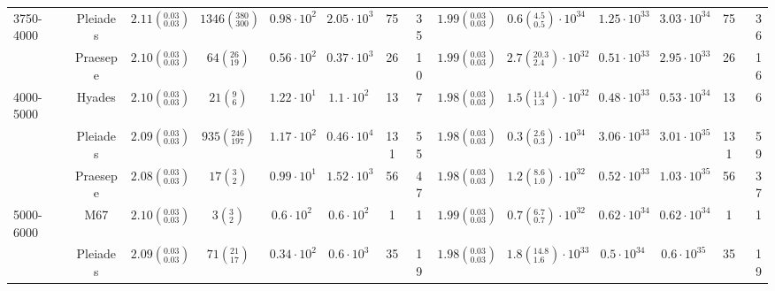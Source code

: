 \begin{tabular}{lccccccccccccr}
3750-4000 & Pleiades &  $2.11\left(^{0.03}_{0.03}\right)$ &    $1346\left(^{380}_{300}\right)$ &    $0.98\cdot 10^{2}$ &    $2.05\cdot 10^{3}$ &                 75 &                 35 &  $1.99\left(^{0.03}_{0.03}\right)$ &   $0.6\left(^{4.5}_{0.5}\right)\cdot 10^{34}$ &       $1.25\cdot 10^{33}$ &       $3.03\cdot 10^{34}$ &                   75 &                   36 \\
          & Praesepe &  $2.10\left(^{0.03}_{0.03}\right)$ &        $64\left(^{26}_{19}\right)$ &    $0.56\cdot 10^{2}$ &    $0.37\cdot 10^{3}$ &                 26 &                 10 &  $1.99\left(^{0.03}_{0.03}\right)$ &  $2.7\left(^{20.3}_{2.4}\right)\cdot 10^{32}$ &       $0.51\cdot 10^{33}$ &       $2.95\cdot 10^{33}$ &                   26 &                   16 \\
4000-5000 & Hyades &  $2.10\left(^{0.03}_{0.03}\right)$ &          $21\left(^{9}_{6}\right)$ &    $1.22\cdot 10^{1}$ &     $1.1\cdot 10^{2}$ &                 13 &                  7 &  $1.98\left(^{0.03}_{0.03}\right)$ &  $1.5\left(^{11.4}_{1.3}\right)\cdot 10^{32}$ &       $0.48\cdot 10^{33}$ &       $0.53\cdot 10^{34}$ &                   13 &                    6 \\
          & Pleiades &  $2.09\left(^{0.03}_{0.03}\right)$ &     $935\left(^{246}_{197}\right)$ &    $1.17\cdot 10^{2}$ &    $0.46\cdot 10^{4}$ &                131 &                 55 &  $1.98\left(^{0.03}_{0.03}\right)$ &   $0.3\left(^{2.6}_{0.3}\right)\cdot 10^{34}$ &       $3.06\cdot 10^{33}$ &       $3.01\cdot 10^{35}$ &                  131 &                   59 \\
          & Praesepe &  $2.08\left(^{0.03}_{0.03}\right)$ &          $17\left(^{3}_{2}\right)$ &    $0.99\cdot 10^{1}$ &    $1.52\cdot 10^{3}$ &                 56 &                 47 &  $1.98\left(^{0.03}_{0.03}\right)$ &   $1.2\left(^{8.6}_{1.0}\right)\cdot 10^{32}$ &       $0.52\cdot 10^{33}$ &       $1.03\cdot 10^{35}$ &                   56 &                   37 \\
5000-6000 & M67 &  $2.10\left(^{0.03}_{0.03}\right)$ &           $3\left(^{3}_{2}\right)$ &     $0.6\cdot 10^{2}$ &     $0.6\cdot 10^{2}$ &                  1 &                  1 &  $1.99\left(^{0.03}_{0.03}\right)$ &   $0.7\left(^{6.7}_{0.7}\right)\cdot 10^{32}$ &       $0.62\cdot 10^{34}$ &       $0.62\cdot 10^{34}$ &                    1 &                    1 \\
          & Pleiades &  $2.09\left(^{0.03}_{0.03}\right)$ &        $71\left(^{21}_{17}\right)$ &    $0.34\cdot 10^{2}$ &     $0.6\cdot 10^{3}$ &                 35 &                 19 &  $1.98\left(^{0.03}_{0.03}\right)$ &  $1.8\left(^{14.8}_{1.6}\right)\cdot 10^{33}$ &        $0.5\cdot 10^{34}$ &        $0.6\cdot 10^{35}$ &                   35 &                   19 \\

\end{tabular}
